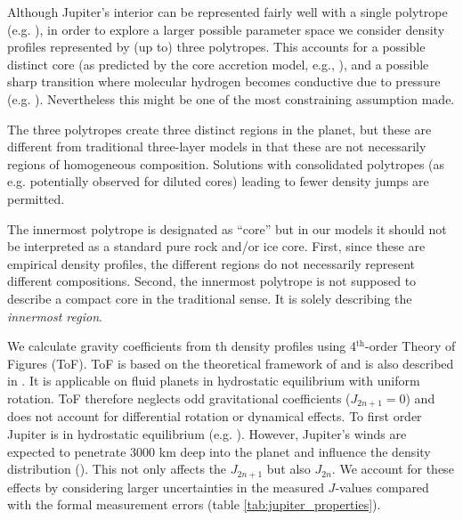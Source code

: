 \documentclass[usenatbib]{mnras}
\begin{document}
Although Jupiter's interior can be represented fairly well with a single polytrope (e.g. \cite{Wisdom_2016, Hubbard1975}), in order to explore a larger possible parameter space we consider density profiles represented by (up to) three polytropes. This accounts for a possible distinct core (as predicted by the core accretion model, e.g., \citet{Pollack1996}), and a possible sharp transition where molecular hydrogen becomes conductive due to pressure (e.g. \cite{Nellis2000, Helled2018}). Nevertheless this might be one of the most constraining assumption made. %

The three polytropes create three distinct regions in the planet, but these are different from traditional three-layer models in that these are not necessarily regions of homogeneous composition. Solutions with consolidated polytropes (as e.g. potentially observed for diluted cores) leading to fewer density jumps are permitted.

The innermost polytrope is designated as ``core'' but in our models it should not be interpreted as a standard pure rock and/or ice core. First, since these are empirical density profiles, the different regions do not necessarily represent different compositions.
Second, the innermost polytrope is not supposed to describe a compact core in the traditional sense. It is solely describing the \textit{innermost region}. 

We calculate gravity coefficients from th density profiles using 4$^{\text{th}}$-order Theory of Figures (ToF). ToF is based on the theoretical framework of \cite{ZharkovVladimirNaumovich1978Popi} and is also described in \cite{Zharkov1970, Zharkov1975, Hubbard2014,Nettelmann_2017}. 
It is applicable on fluid planets in hydrostatic equilibrium with uniform rotation. 
ToF therefore neglects odd gravitational coefficients ($J_{2n+1}=0$) and does not account for differential rotation or dynamical effects. To first order Jupiter is in hydrostatic equilibrium (e.g. \cite{Guillot2014}).
However, Jupiter's winds are expected to penetrate 3000 km deep into the planet and influence the density distribution (\cite{Kaspi2018}). This not only affects the $J_{2n+1}$ but also $J_{2n}$. We account for these effects by considering larger uncertainties in the measured $J$-values compared with the formal measurement errors (table \ref{tab:jupiter_properties}). %
\end{document}
